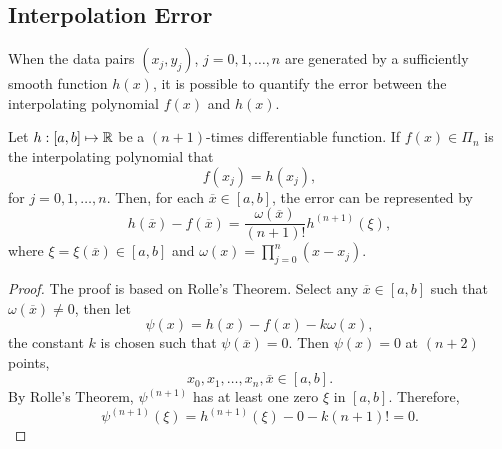 \subsection{Interpolation Error}
\label{SSec: 2-Int-Err}
When the data pairs $(x_j, y_j)$, $j=0,1,\dots, n$ are generated by a sufficiently smooth function $h(x)$, it is possible to quantify the error between the interpolating polynomial $f(x)$ and $h(x)$. 
\begin{theorem}
\label{Thm: 2-Int-err}
    Let $h: [a, b]\mapsto \mathbb R$ be a $(n+1)$-times differentiable function. If $f(x)\in\Pi_n$ is the interpolating polynomial that 
    $$f(x_j) = h(x_j),$$
    for $j=0,1,\dots, n$. Then, for each $\overline{x}\in [a, b]$, the error can be represented by 
    \begin{equation}
        h(\overline{x}) - f(\overline{x}) = \frac{\omega(\overline{x})}{(n+1)!} h^{(n+1)}(\xi),
    \end{equation}
    where $\xi = \xi(\overline{x})\in [a, b]$ and $\omega(x) = \prod_{j=0}^n (x - x_j)$.
\end{theorem}
\begin{proof}
    The proof is based on Rolle's Theorem. Select any $\overline{x}\in[a, b]$ such that $\omega(\overline{x})\neq 0$, then let 
    $$\psi(x) = h(x) - f(x) - k\omega (x),$$
    the constant $k$ is chosen such that $\psi(\overline{x}) = 0$. Then $\psi(x) = 0$ at $(n+2)$ points, 
    $$x_0, x_1, \dots, x_n, \overline{x}\in [a, b].$$
    By Rolle's Theorem, $\psi^{(n+1)}$ has at least one zero $\xi$ in $[a,b]$. Therefore,
    \begin{equation}
        \psi^{(n+1)}(\xi) = h^{(n+1)}(\xi) - 0 - k(n+1)! = 0.
    \end{equation}
\end{proof}


